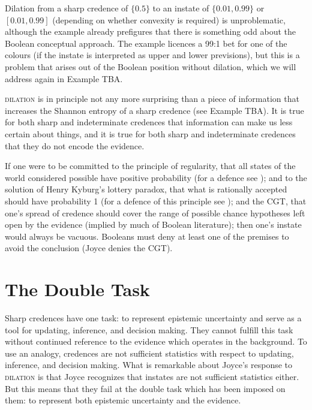 \documentclass[11pt]{article}
\begin{document}
Dilation from a sharp credence of $\{0.5\}$ to an instate of
$\{0.01,0.99\}$ or $[0.01,0.99]$ (depending on whether convexity is
required) is unproblematic, although the example already prefigures
that there is something odd about the Boolean conceptual approach. The
example licences a 99:1 bet for one of the colours (if the instate is
interpreted as upper and lower previsions), but this is a problem that
arises out of the Boolean position without dilation, which we will
address again in Example TBA\tbd{}.

\textsc{dilation} is in principle not any more surprising than a piece
of information that increases the Shannon entropy of a sharp credence
(see Example TBA\tbd{}). It is true for both sharp and indeterminate credences
that information can make us less certain about things, and it is true
for both sharp and indeterminate credences that they do not encode the
evidence.

If one were to be committed to the principle of regularity, that all
states of the world considered possible have positive probability (for
a defence see ); and to the solution of
Henry Kyburg's lottery paradox, that what is rationally accepted
should have probability 1 (for a defence of this principle see
); and the CGT, that one's spread of
credence should cover the range of possible chance hypotheses left
open by the evidence (implied by much of Boolean literature); then
one's instate would always be vacuous. Booleans must deny at least one
of the premises to avoid the conclusion (Joyce denies the CGT).

\section{The Double Task}
\label{TheDoubleTask}

Sharp credences have one task: to represent epistemic uncertainty and
serve as a tool for updating, inference, and decision making. They
cannot fulfill this task without continued reference to the evidence
which operates in the background. To use an analogy, credences are not
sufficient statistics with respect to updating, inference, and
decision making. What is remarkable about Joyce's response to
\textsc{dilation} is that Joyce recognizes that instates are not
sufficient statistics either. But this means that they fail at the
double task which has been imposed on them: to represent both
epistemic uncertainty and the evidence.
\end{document}
